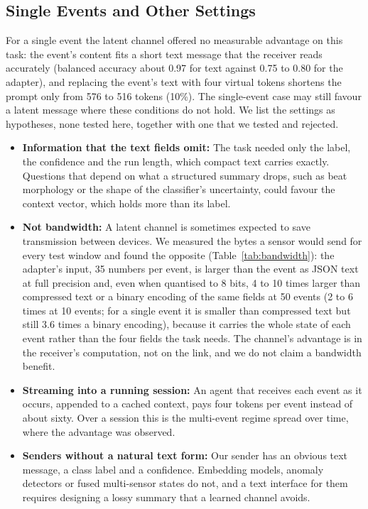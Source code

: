 \subsection{Single Events and Other Settings}
For a single event the latent channel offered no measurable advantage on this task: the event's content fits a short text message that the receiver reads accurately (balanced accuracy about 0.97 for text against 0.75 to 0.80 for the adapter), and replacing the event's text with four virtual tokens shortens the prompt only from 576 to 516 tokens (10\%). The single-event case may still favour a latent message where these conditions do not hold. We list the settings as hypotheses, none tested here, together with one that we tested and rejected.
\begin{itemize}
\item \textbf{Information that the text fields omit:} The task needed only the label, the confidence and the run length, which compact text carries exactly. Questions that depend on what a structured summary drops, such as beat morphology or the shape of the classifier's uncertainty, could favour the context vector, which holds more than its label.
\item \textbf{Not bandwidth:} A latent channel is sometimes expected to save transmission between devices. We measured the bytes a sensor would send for every test window and found the opposite (Table~\ref{tab:bandwidth}): the adapter's input, 35 numbers per event, is larger than the event as JSON text at full precision and, even when quantised to 8 bits, 4 to 10 times larger than compressed text or a binary encoding of the same fields at 50 events (2 to 6 times at 10 events; for a single event it is smaller than compressed text but still 3.6 times a binary encoding), because it carries the whole state of each event rather than the four fields the task needs. The channel's advantage is in the receiver's computation, not on the link, and we do not claim a bandwidth benefit.
\item \textbf{Streaming into a running session:} An agent that receives each event as it occurs, appended to a cached context, pays four tokens per event instead of about sixty. Over a session this is the multi-event regime spread over time, where the advantage was observed.
\item \textbf{Senders without a natural text form:} Our sender has an obvious text message, a class label and a confidence. Embedding models, anomaly detectors or fused multi-sensor states do not, and a text interface for them requires designing a lossy summary that a learned channel avoids.
\end{itemize}

